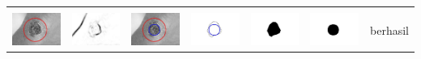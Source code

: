 \begin{table}[H]
\begin{tabular}{|m{0.7in}|m{0.7in}|m{0.7in}|m{0.7in}|m{0.7in}|m{0.7in}|m{0.7in}|}
		&  &  & & & &  \\
		\includegraphics[width=0.7in]{dataset/dataset_3/luka_hitam/ready/14_integer_init.jpg}&
		\includegraphics[width=0.7in]{dataset/dataset_3/luka_hitam/ready/14_integer_ext.jpg}&
		\includegraphics[width=0.7in]{dataset/dataset_3/luka_hitam/ready/14_integer_result.jpg}&
		\includegraphics[width=0.7in]{dataset/dataset_3/luka_hitam/ready/14_gt_r_integer.jpg}&
		\includegraphics[width=0.7in]{dataset/dataset_3/luka_hitam/ready/14_r.jpg}&
		\includegraphics[width=0.7in]{dataset/dataset_3/luka_hitam/ready/14_integer_r.jpg}&
		berhasil\\
		\hline
		

\end{tabular}
\end{table}
